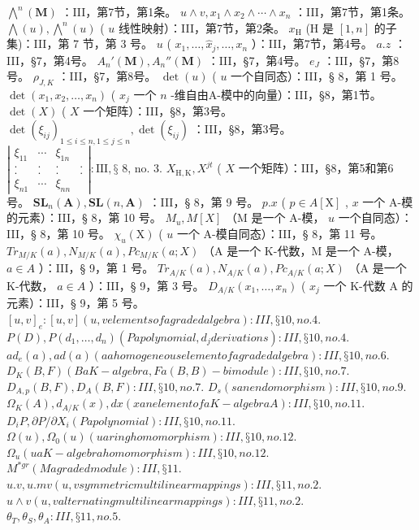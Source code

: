 \(\bigwedge^{n}(\mathbf{M})\) ：III，第7节，第1条。 \(u \wedge v, x_{1} \wedge x_{2} \wedge \cdots \wedge x_{n}\) ：III，第7节，第1条。 \(\bigwedge(u), \bigwedge^{n}(u)\) ( \(u\) 线性映射）：III，第7节，第2条。 \(x_{\mathrm{H}}\) (H 是 \([1, n]\) 的子集)：III，第 7 节，第 3 号。 \(u\) ( \(x_{1}, \ldots, \hat{x}_{j}, \ldots, x_{n}\) ）：III，第7节，第4号。 \(a.z\) ：III，§7，第4号。 \(A_{n}'(\mathbf{M}), A_{n}''(\mathbf{M})\) ：III，§7，第4号。 \(e_{J}\) ：III，§7，第8号。 \(\rho_{J,K}\) ：III，§7，第8号。 \(\det(u)\) ( \(u\) 一个自同态）：III，§ 8，第 1 号。 \(\det(x_{1}, x_{2}, \ldots, x_{n})\) ( \(x_{j}\) 一个 \(n\) -维自由A-模中的向量）：III，§8，第1节。 \(\det(X)\) ( \(X\) 一个矩阵）：III，§8，第3号。 \(\det(\xi_{ij})_{1 \leq i \leq n, 1 \leq j \leq n}, \det(\xi_{ij})\) ：III，§8，第3号。 \(\left| \begin{array}{cccc}\xi_{11} & \cdots & \xi_{1n} \\ . & . & . & . \\ . & . & . & . \\ \xi_{n1} & \cdots & \xi_{nn} \end{array} \right|: \text{III}, \text{§ 8, no. 3.}\) \(X_{\mathrm{H,K}}, X^{jt}\) ( \(X\) 一个矩阵）：III，§8，第5和第6号。 \(\mathbf{SL}_{n}(\mathbf{A}), \mathbf{SL}(n, \mathbf{A})\) ：III，§ 8，第 9 号。 \(p.x\) ( \(p \in A[\mathrm{X}]\) , \(x\) 一个 A-模的元素）：III，§ 8，第 10 号。 \(M_{u}, M[X]\) （M 是一个 A-模， \(u\) 一个自同态）：III，§ 8，第 10 号。 \(\chi_{u}(\mathrm{X})\) ( \(u\) 一个 A-模自同态）：III，§ 8，第 11 号。 \(Tr_{M/K}(a), N_{M/K}(a), Pc_{M/K}(a; X)\) （A 是一个 K-代数，M 是一个 A-模， \(a \in A\) ）：III，§ 9，第 1 号。 \(Tr_{A/K}(a), N_{A/K}(a), Pc_{A/K}(a; X)\) （A 是一个 K-代数， \(a \in A\) ）：III，§ 9，第 3 号。 \(D_{A/K}(x_{1}, \ldots, x_{n})\) ( \(x_{j}\) 一个 K-代数 A 的元素）：III，§ 9，第 5 号。 \([u,v]_{e}: [u,v] (u,v elements of a graded algebra) : III, § 10, no. 4.\) \(P(D), P(d_{1}, \ldots, d_{n}) (P a polynomial, d_{j} derivations) : III, § 10, no. 4.\) \(ad_{e}(a), ad(a) (a a homogeneous element of a graded algebra) : III, § 10, no. 6.\) \(D_{K}(B,F) (B a K-algebra, F a (B,B)-bimodule) : III, § 10, no. 7.\) \(D_{A,p}(B,F), D_{A}(B,F) : III, § 10, no. 7.\) \(D_{s} (s an endomorphism) : III, § 10, no. 9.\) \(\Omega_{K}(A), d_{A/K}(x), dx (x an element of a K-algebra A) : III, § 10, no. 11.\) \(D_{i}P, ∂P/∂X_{i} (P a polynomial) : III, § 10, no. 11.\) \(Ω(u), Ω_{0}(u) (u a ring homomorphism) : III, § 10, no. 12.\) \(Ω_{u} (u a K-algebra homomorphism) : III, § 10, no. 12.\) \(M^{*gr} (M a graded module) : III, § 11.\) \(u.v, u.mv (u,v symmetric multilinear mappings) : III, § 11, no. 2.\) \(u \wedge v (u,v alternating multilinear mappings) : III, § 11, no. 2.\) \(θ_{T}, θ_{S}, θ_{A} : III, § 11, no. 5.\)

